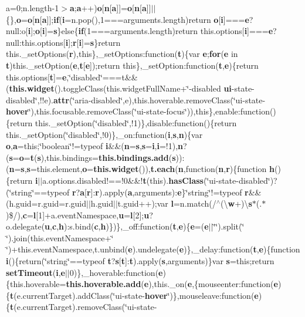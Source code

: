 {a}=0;n.\-length-\/1$>${\bf a};{\bf a}++){\bf o}\mbox{[}{\bf n}\mbox{[}{\bf a}\mbox{]}\mbox{]}={\bf o}\mbox{[}{\bf n}\mbox{[}{\bf a}\mbox{]}\mbox{]}$\vert$$\vert$\{\},{\bf o}={\bf o}\mbox{[}{\bf n}\mbox{[}{\bf a}\mbox{]}\mbox{]};{\bf if}({\bf i}=n.\-pop(),1===arguments.\-length)return {\bf o}\mbox{[}{\bf i}\mbox{]}==={\bf e}?null\-:o\mbox{[}{\bf i}\mbox{]};{\bf o}\mbox{[}{\bf i}\mbox{]}={\bf s}\}else\{{\bf if}(1===arguments.\-length)return this.\-options\mbox{[}{\bf i}\mbox{]}==={\bf e}?null\-:this.\-options\mbox{[}{\bf i}\mbox{]};{\bf r}\mbox{[}{\bf i}\mbox{]}={\bf s}\}return this.\-\_\-set\-Options({\bf r}),this\},\-\_\-set\-Options\-:function({\bf t})\{var {\bf e};{\bf for}({\bf e} in {\bf t})this.\-\_\-set\-Option({\bf e},{\bf t}\mbox{[}{\bf e}\mbox{]});return this\},\-\_\-set\-Option\-:function({\bf t},{\bf e})\{return this.\-options\mbox{[}{\bf t}\mbox{]}={\bf e},\char`\"{}disabled\char`\"{}===t\&\&({\bf this.\-widget}().toggle\-Class(this.\-widget\-Full\-Name+\char`\"{}-\/disabled {\bf ui}-\/state-\/disabled\char`\"{},!!e).{\bf attr}(\char`\"{}aria-\/disabled\char`\"{},e),this.\-hoverable.\-remove\-Class(\char`\"{}ui-\/state-\/{\bf hover}\char`\"{}),this.\-focusable.\-remove\-Class(\char`\"{}ui-\/state-\/focus\char`\"{})),this\},enable\-:function()\{return this.\-\_\-set\-Option(\char`\"{}disabled\char`\"{},!1)\},disable\-:function()\{return this.\-\_\-set\-Option(\char`\"{}disabled\char`\"{},!0)\},\-\_\-on\-:function({\bf i},{\bf s},{\bf n})\{var {\bf o},{\bf a}=this;\char`\"{}boolean\char`\"{}!=typeof {\bf i}\&\&({\bf n}={\bf s},{\bf s}={\bf i},{\bf i}=!1),{\bf n}?({\bf s}={\bf o}={\bf t}({\bf s}),this.\-bindings={\bf this.\-bindings.\-add}({\bf s}))\-:({\bf n}={\bf s},{\bf s}=this.\-element,{\bf o}={\bf this.\-widget}()),{\bf t.\-each}({\bf n},function({\bf n},{\bf r})\{function {\bf h}()\{return {\bf i}$\vert$$\vert$a.\-options.\-disabled!==!0\&\&!{\bf t}(this).{\bf has\-Class}(\char`\"{}ui-\/state-\/disabled\char`\"{})?(\char`\"{}string\char`\"{}==typeof {\bf r}?{\bf a}\mbox{[}{\bf r}\mbox{]}\-:{\bf r}).apply({\bf a},arguments)\-:{\bf e}\}\char`\"{}string\char`\"{}!=typeof {\bf r}\&\&(h.\-guid=r.\-guid=r.\-guid$\vert$$\vert$h.\-guid$\vert$$\vert$t.\-guid++);var {\bf l}=n.\-match(/$^\wedge$(\textbackslash{}{\bf w}+)\textbackslash{}{\bf s}$\ast$(.$\ast$)\$/),{\bf c}={\bf l}\mbox{[}1\mbox{]}+a.\-event\-Namespace,{\bf u}={\bf l}\mbox{[}2\mbox{]};{\bf u}?o.\-delegate({\bf u},{\bf c},{\bf h})\-:s.\-bind({\bf c},{\bf h})\})\},\-\_\-off\-:function({\bf t},{\bf e})\{{\bf e}=({\bf e}$\vert$$\vert$\char`\"{}\char`\"{}).split(\char`\"{} \char`\"{}).join(this.\-event\-Namespace+\char`\"{} \char`\"{})+this.\-event\-Namespace,t.\-unbind({\bf e}).undelegate({\bf e})\},\-\_\-delay\-:function({\bf t},{\bf e})\{function {\bf i}()\{return(\char`\"{}string\char`\"{}==typeof {\bf t}?{\bf s}\mbox{[}{\bf t}\mbox{]}\-:{\bf t}).apply({\bf s},arguments)\}var {\bf s}=this;return {\bf set\-Timeout}({\bf i},{\bf e}$\vert$$\vert$0)\},\-\_\-hoverable\-:function({\bf e})\{this.\-hoverable={\bf this.\-hoverable.\-add}({\bf e}),this.\-\_\-on({\bf e},\{mouseenter\-:function({\bf e})\{{\bf t}(e.\-current\-Target).add\-Class(\char`\"{}ui-\/state-\/{\bf hover}\char`\"{})\},mouseleave\-:function({\bf e})\{{\bf t}(e.\-current\-Target).remove\-Class(\char`\"{}ui-\/state-\/{\bf }
